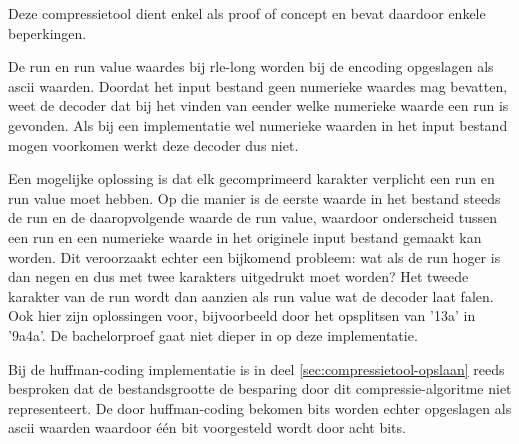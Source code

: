 Deze \gls{compressietool} dient enkel als proof of concept en bevat daardoor enkele beperkingen. 

De run en run value waardes bij \gls{rle-long} worden bij de \gls{encoding} opgeslagen als \gls{ascii} waarden. Doordat het input bestand geen numerieke waardes mag bevatten, weet de \gls{decoder} dat bij het vinden van eender welke numerieke waarde een run is gevonden. Als bij een implementatie wel numerieke waarden in het input bestand mogen voorkomen werkt deze \gls{decoder} dus niet. 

Een mogelijke oplossing is dat elk gecomprimeerd karakter verplicht een run en run value moet hebben. Op die manier is de eerste waarde in het bestand steeds de run en de daaropvolgende waarde de run value, waardoor onderscheid tussen een run en een numerieke waarde in het originele input bestand gemaakt kan worden. Dit veroorzaakt echter een bijkomend probleem: wat als de run hoger is dan negen en dus met twee karakters uitgedrukt moet worden? Het tweede karakter van de run wordt dan aanzien als run value wat de \gls{decoder} laat falen. Ook hier zijn oplossingen voor, bijvoorbeeld door het opsplitsen van '13a' in '9a4a'. De bachelorproef gaat niet dieper in op deze implementatie.

Bij de \gls{huffman-coding} implementatie is in deel \ref{sec:compressietool-opslaan} reeds besproken dat de bestandsgrootte de besparing door dit \gls{compressie-algoritme} niet representeert. De door \gls{huffman-coding} bekomen bits worden echter opgeslagen als \gls{ascii} waarden waardoor één \gls{bit} voorgesteld wordt door acht \glspl{bit}.